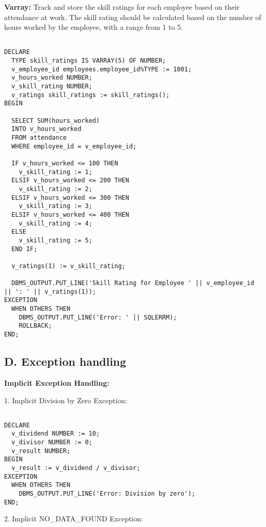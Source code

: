 \documentclass[11pt]{article} %
\begin{document}
\textbf{Varray:} Track and store the skill ratings for each employee based on their attendance at work. The skill rating should be calculated based on the number of hours worked by the employee, with a range from 1 to 5.

\begin{small}
\begin{verbatim}

DECLARE
  TYPE skill_ratings IS VARRAY(5) OF NUMBER;
  v_employee_id employees.employee_id%TYPE := 1001;
  v_hours_worked NUMBER;
  v_skill_rating NUMBER;
  v_ratings skill_ratings := skill_ratings();
BEGIN

  SELECT SUM(hours_worked)
  INTO v_hours_worked
  FROM attendance
  WHERE employee_id = v_employee_id;

  IF v_hours_worked <= 100 THEN
    v_skill_rating := 1;
  ELSIF v_hours_worked <= 200 THEN
    v_skill_rating := 2;
  ELSIF v_hours_worked <= 300 THEN
    v_skill_rating := 3;
  ELSIF v_hours_worked <= 400 THEN
    v_skill_rating := 4;
  ELSE
    v_skill_rating := 5;
  END IF;

  v_ratings(1) := v_skill_rating;

  DBMS_OUTPUT.PUT_LINE('Skill Rating for Employee ' || v_employee_id || ': ' || v_ratings(1));
EXCEPTION
  WHEN OTHERS THEN
    DBMS_OUTPUT.PUT_LINE('Error: ' || SQLERRM);
    ROLLBACK;
END;

\end{verbatim}
\end{small}

\subsection*{D. Exception handling}

\textbf{Implicit Exception Handling:}


1. Implicit Division by Zero Exception:

\begin{small}
\begin{verbatim}

DECLARE
  v_dividend NUMBER := 10;
  v_divisor NUMBER := 0;
  v_result NUMBER;
BEGIN
  v_result := v_dividend / v_divisor;
EXCEPTION
  WHEN OTHERS THEN
    DBMS_OUTPUT.PUT_LINE('Error: Division by zero');
END;

\end{verbatim}
\end{small}

2. Implicit NO\_DATA\_FOUND Exception:
\end{document}
